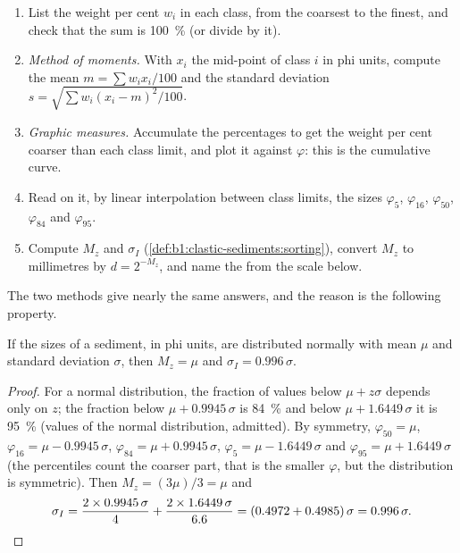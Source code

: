 \begin{method}\label{met:b1:clastic-sediments:graphic}
\begin{enumerate}
  \item List the weight per cent $w_i$ in each class, from the coarsest to the
        finest, and check that the sum is \qty{100}{\percent} (or divide by it).
  \item \emph{Method of moments.} With $x_i$ the mid-point of class $i$ in phi
        units, compute the mean $m = \sum w_i x_i / 100$ and the standard
        deviation $s = \sqrt{\sum w_i (x_i - m)^2 / 100}$.
  \item \emph{Graphic measures.} Accumulate the percentages to get the weight
        per cent coarser than each class limit, and plot it against $\varphi$:
        this is the cumulative curve.
  \item Read on it, by linear interpolation between class limits, the sizes
        $\varphi_5$, $\varphi_{16}$, $\varphi_{50}$, $\varphi_{84}$ and
        $\varphi_{95}$.
  \item Compute $M_z$ and $\sigma_I$ (\cref{def:b1:clastic-sediments:sorting}),
        convert $M_z$ to millimetres by $d = 2^{-M_z}$, and name the 
        from the scale below.
\end{enumerate}
\end{method}

The two methods give nearly the same answers, and the reason is the following
property.

\begin{proposition}\label{prop:b1:clastic-sediments:normal}
If the sizes of a sediment, in phi units, are distributed normally with mean
$\mu$ and standard deviation $\sigma$, then $M_z = \mu$ and $\sigma_I = 0.996\,\sigma$.
\end{proposition}

\begin{proof}
For a normal distribution, the fraction of values below $\mu + z\sigma$ depends
only on $z$; the fraction below $\mu + 0.9945\,\sigma$ is \qty{84}{\percent}
and below $\mu + 1.6449\,\sigma$ it is \qty{95}{\percent} (values of the normal
distribution, admitted). By symmetry, $\varphi_{50} = \mu$, $\varphi_{16} = \mu -
0.9945\,\sigma$, $\varphi_{84} = \mu + 0.9945\,\sigma$, $\varphi_5 = \mu -
1.6449\,\sigma$ and $\varphi_{95} = \mu + 1.6449\,\sigma$ (the percentiles count
the coarser part, that is the smaller $\varphi$, but the distribution is
symmetric). Then $M_z = (3\mu)/3 = \mu$ and
\[
  \sigma_I = \frac{2 \times 0.9945\,\sigma}{4} + \frac{2 \times 1.6449\,\sigma}{6.6}
  = (0.4972 + 0.4985)\,\sigma = 0.996\,\sigma. \qedhere
\]
\end{proof}

